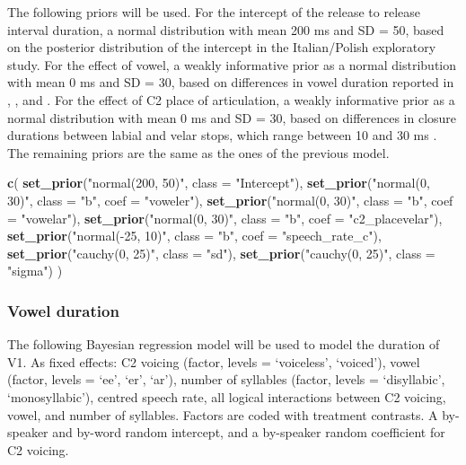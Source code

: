 \documentclass[11pt,]{article}
\newenvironment{Shaded}{\begin{snugshade}}{\end{snugshade}}
\newcommand{\DataTypeTok}[1]{\textcolor[rgb]{0.13,0.29,0.53}{#1}}
\newcommand{\KeywordTok}[1]{\textcolor[rgb]{0.13,0.29,0.53}{\textbf{#1}}}
\newcommand{\NormalTok}[1]{#1}
\newcommand{\StringTok}[1]{\textcolor[rgb]{0.31,0.60,0.02}{#1}}
\begin{document}
The following priors will be used. For the intercept of the release to
release interval duration, a normal distribution with mean 200 ms and SD
= 50, based on the posterior distribution of the intercept in the
Italian/Polish exploratory study. For the effect of vowel, a weakly
informative prior as a normal distribution with mean 0 ms and SD = 30,
based on differences in vowel duration reported in \citet{heffner1937},
\citet{house1953}, and \citet{hertrich1997}. For the effect of C2 place
of articulation, a weakly informative prior as a normal distribution
with mean 0 ms and SD = 30, based on differences in closure durations
between labial and velar stops, which range between 10 and 30 ms
\citep{sharf1962}. The remaining priors are the same as the ones of the
previous model.

\begin{Shaded}
\begin{Highlighting}[]
\KeywordTok{c}\NormalTok{(}
  \KeywordTok{set_prior}\NormalTok{(}\StringTok{"normal(200, 50)"}\NormalTok{, }\DataTypeTok{class =} \StringTok{"Intercept"}\NormalTok{),}
  \KeywordTok{set_prior}\NormalTok{(}\StringTok{"normal(0, 30)"}\NormalTok{, }\DataTypeTok{class =} \StringTok{"b"}\NormalTok{, }\DataTypeTok{coef =} \StringTok{"voweler"}\NormalTok{),}
  \KeywordTok{set_prior}\NormalTok{(}\StringTok{"normal(0, 30)"}\NormalTok{, }\DataTypeTok{class =} \StringTok{"b"}\NormalTok{, }\DataTypeTok{coef =} \StringTok{"vowelar"}\NormalTok{),}
  \KeywordTok{set_prior}\NormalTok{(}\StringTok{"normal(0, 30)"}\NormalTok{, }\DataTypeTok{class =} \StringTok{"b"}\NormalTok{, }\DataTypeTok{coef =} \StringTok{"c2_placevelar"}\NormalTok{),}
  \KeywordTok{set_prior}\NormalTok{(}\StringTok{"normal(-25, 10)"}\NormalTok{, }\DataTypeTok{class =} \StringTok{"b"}\NormalTok{, }\DataTypeTok{coef =} \StringTok{"speech_rate_c"}\NormalTok{),}
  \KeywordTok{set_prior}\NormalTok{(}\StringTok{"cauchy(0, 25)"}\NormalTok{, }\DataTypeTok{class =} \StringTok{"sd"}\NormalTok{),}
  \KeywordTok{set_prior}\NormalTok{(}\StringTok{"cauchy(0, 25)"}\NormalTok{, }\DataTypeTok{class =} \StringTok{"sigma"}\NormalTok{)}
\NormalTok{)}
\end{Highlighting}
\end{Shaded}

\hypertarget{vowel-duration}{%
\subsubsection{Vowel duration}\label{vowel-duration}}

The following Bayesian regression model will be used to model the
duration of V1. As fixed effects: C2 voicing (factor, levels =
`voiceless', `voiced'), vowel (factor, levels = `ee', `er', `ar'),
number of syllables (factor, levels = `disyllabic', `monosyllabic'),
centred speech rate, all logical interactions between C2 voicing, vowel,
and number of syllables. Factors are coded with treatment contrasts. A
by-speaker and by-word random intercept, and a by-speaker random
coefficient for C2 voicing.
\end{document}
